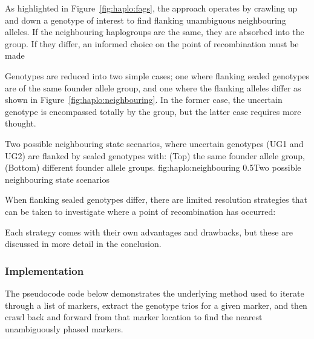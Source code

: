 As highlighted in Figure~\ref{fig:haplo:fags}, the approach operates by crawling up and down a genotype of interest to find flanking unambiguous neighbouring alleles. If the neighbouring haplogroups are the same, they are absorbed into the group. If they differ, an informed choice on the point of recombination must be made

Genotypes are reduced into two simple cases; one where flanking sealed genotypes are of the same founder allele group, and one where the flanking alleles differ as shown in Figure~\ref{fig:haplo:neighbouring}. In the former case, the uncertain genotype is encompassed totally by the group, but the latter case requires more thought.

	{Two possible neighbouring state scenarios, where uncertain genotypes (UG1 and UG2) are flanked by sealed genotypes with: (Top) the same founder allele group, (Bottom) different founder allele groups.}
	{fig:haplo:neighbouring}
	{0.5}{Two possible neighbouring state scenarios}

When flanking sealed genotypes differ, there are limited resolution strategies that can be taken to investigate where a point of recombination has occurred:

\begin{enumerate}

Each strategy comes with their own advantages and drawbacks, but these are discussed in more detail in the conclusion.
\end{enumerate}

\subsubsection{Implementation}

The pseudocode code below demonstrates the underlying method used to iterate through a list of markers, extract the genotype trios for a given marker, and then crawl back and forward from that marker location to find the nearest unambiguously phased markers. 


